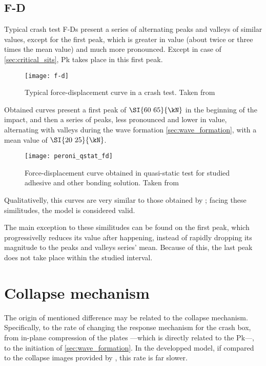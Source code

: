 \subsection{F-D}
\label{sec:F-D}

Typical crash test \glspl{F-D} present a series of alternating peaks and valleys of similar values, except for the first peak, which is greater in value (about twice or three times the mean value) and much more pronounced. Except in case of \ref{sec:critical_sits}, \gls{Pk} takes place in this first peak.

\begin{figure}
\centering
\texttt{[image: f-d]}
\caption{Typical force-displacement curve in a crash test. Taken from \citep{Scattina2011}}
\label{fig:damage_evo2D}
\end{figure}

Obtained curves present a first peak of $\SI{60~65}{\kN}$ in the beginning of the impact, and then a series of peaks, less pronounced and lower in value, alternating with valleys during the wave formation \ref{sec:wave_formation}, with a mean value of $\SI{20~25}{\kN}$.


\begin{figure}
\centering
\texttt{[image: peroni\_qstat\_fd]}
\caption{Force-displacement curve obtained in quasi-static test for studied adhesive and other bonding solution. Taken from \citep{Peroni2009}}
\label{fig:damage_evo2D}
\end{figure}

Qualitativelly, this curves are very similar to those obtained by \citet{Peroni2009}; facing these similitudes, the model is considered valid.

The main exception to these similitudes can be found on the first peak, which progressivelly reduces its value after happening, instead of rapidly dropping its magnitude to the peaks and valleys series' mean. Because of this, the last peak does not take place within the studied interval.

\section{Collapse mechanism}

The origin of mentioned difference may be related to the collapse mechanism. Specifically, to the rate of changing the response mechanism for the crash box, from in-plane compression of the plates ---which is directly related to the \gls{Pk}---, to the initiation of \ref{sec:wave_formation}. In the developped model, if compared to the collapse images provided by \citet{Scattina2011}, this rate is far slower.

